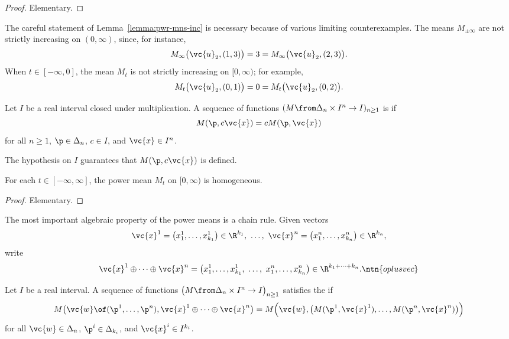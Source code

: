 \begin{proof}
Elementary.
\end{proof}

\begin{remark}
The careful statement of Lemma~\ref{lemma:pwr-mns-inc} is necessary because
of various limiting counterexamples.  The means $M_{\pm\infty}$ are not
strictly increasing on $(0, \infty)$, since, for instance,
\[
M_\infty\bigl(\vc{u}_2, (1, 3)\bigr) 
=
3 
= 
M_\infty\bigl(\vc{u}_2, (2, 3)\bigr).
\]
When $t \in [-\infty, 0]$, the mean $M_t$ is not strictly increasing on
$[0, \infty)$; for example,
\[
M_t\bigl( \vc{u}_2, (0, 1)\bigr)
=
0
=
M_t\bigl( \vc{u}_2, (0, 2)\bigr).
\]
\end{remark}

\begin{defn}
Let $I$ be a real interval closed under multiplication.  A sequence of
functions $(M \from \Delta_n \times I^n \to I)_{n \geq 1}$ is
%
%
% 
if 
\[
M(\p, c\vc{x}) = cM(\p, \vc{x})
\]
for all $n \geq 1$, $\p \in \Delta_n$, $c \in I$, and $\vc{x} \in I^n$.
\end{defn}

The hypothesis on $I$ guarantees that $M(\p, c\vc{x})$ is defined.

\begin{lemma}
% 
For each $t \in [-\infty, \infty]$, the power mean $M_t$ on $[0, \infty)$
is homogeneous.  
\end{lemma}

\begin{proof}
Elementary.
\end{proof}

The most important algebraic property of the power means is a
chain rule.  Given vectors
\[
\vc{x}^1 = \bigl(x^1_1, \ldots, x^1_{k_1}\bigr) \in \R^{k_1},
\ \ldots, \ 
\vc{x}^n = \bigl(x^n_1, \ldots, x^n_{k_n}\bigr) \in \R^{k_n},
\]
write
\[
\vc{x}^1 \oplus \cdots \oplus \vc{x}^n
=
\bigl(x^1_1, \ldots, x^1_{k_1}, \ \ldots, \ x^n_1, \ldots, x^n_{k_n}\bigr)
\in 
\R^{k_1 + \cdots + k_n}.
\ntn{oplusvec}
\]

\begin{defn}
Let $I$ be a real interval.  A sequence of functions $\bigl( M \from
\Delta_n \times I^n \to I \bigr)_{n \geq 1}$ satisfies the  if
\[
M\bigl(\vc{w} \of (\p^1, \ldots, \p^n), 
\vc{x}^1 \oplus\cdots\oplus \vc{x}^n\bigr)
=
M\Bigl(\vc{w},
\bigl( M(\p^1, \vc{x}^1), \ldots, M(\p^n, \vc{x}^n) \bigr)
\Bigr)
\]
for all $\vc{w} \in \Delta_n$, $\p^i \in \Delta_{k_i}$, and $\vc{x}^i \in
I^{k_i}$.
\end{defn}

